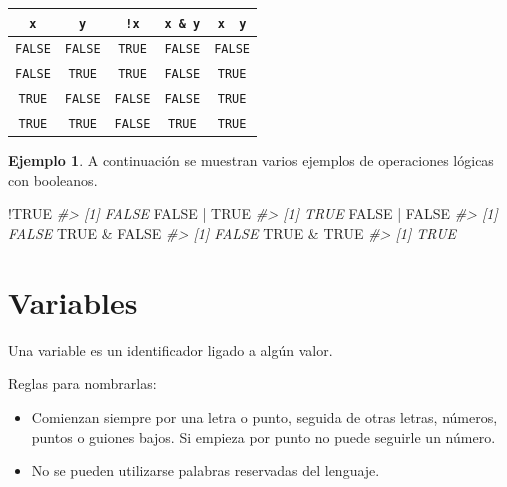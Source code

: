 \documentclass[
]{book}
\newenvironment{Shaded}{\begin{snugshade}}{\end{snugshade}}
\newcommand{\CommentTok}[1]{\textcolor[rgb]{0.56,0.35,0.01}{\textit{#1}}}
\newcommand{\ConstantTok}[1]{\textcolor[rgb]{0.00,0.00,0.00}{#1}}
\newcommand{\SpecialCharTok}[1]{\textcolor[rgb]{0.00,0.00,0.00}{#1}}
\providecommand{\tightlist}{%
  \setlength{\itemsep}{0pt}\setlength{\parskip}{0pt}}
\theoremstyle{definition}
\theoremstyle{definition}
\newtheorem{example}{Ejemplo}[chapter]
\theoremstyle{definition}
\theoremstyle{definition}
\theoremstyle{remark}
\begin{document}
\begin{longtable}[]{@{}ccccc@{}}
\toprule
\texttt{x} & \texttt{y} & \texttt{!x} & \texttt{x\ \&\ y} & \texttt{x\ \textbar{}\ y} \\
\midrule
\endhead
\texttt{FALSE} & \texttt{FALSE} & \texttt{TRUE} & \texttt{FALSE} & \texttt{FALSE} \\
\texttt{FALSE} & \texttt{TRUE} & \texttt{TRUE} & \texttt{FALSE} & \texttt{TRUE} \\
\texttt{TRUE} & \texttt{FALSE} & \texttt{FALSE} & \texttt{FALSE} & \texttt{TRUE} \\
\texttt{TRUE} & \texttt{TRUE} & \texttt{FALSE} & \texttt{TRUE} & \texttt{TRUE} \\
\bottomrule
\end{longtable}

\begin{example}

A continuación se muestran varios ejemplos de operaciones lógicas con booleanos.

\begin{Shaded}
\begin{Highlighting}[]
\SpecialCharTok{!}\ConstantTok{TRUE}
\CommentTok{\#\textgreater{} [1] FALSE}
\ConstantTok{FALSE} \SpecialCharTok{|} \ConstantTok{TRUE}
\CommentTok{\#\textgreater{} [1] TRUE}
\ConstantTok{FALSE} \SpecialCharTok{|} \ConstantTok{FALSE}
\CommentTok{\#\textgreater{} [1] FALSE}
\ConstantTok{TRUE} \SpecialCharTok{\&} \ConstantTok{FALSE}
\CommentTok{\#\textgreater{} [1] FALSE}
\ConstantTok{TRUE} \SpecialCharTok{\&} \ConstantTok{TRUE}
\CommentTok{\#\textgreater{} [1] TRUE}
\end{Highlighting}
\end{Shaded}

\end{example}

\hypertarget{variables}{%
\section{Variables}\label{variables}}

Una variable es un identificador ligado a algún valor.

Reglas para nombrarlas:

\begin{itemize}
\tightlist
\item
  Comienzan siempre por una letra o punto, seguida de otras letras, números, puntos o guiones bajos. Si empieza por punto no puede seguirle un número.
\item
  No se pueden utilizarse palabras reservadas del lenguaje.
\end{itemize}
\end{document}
